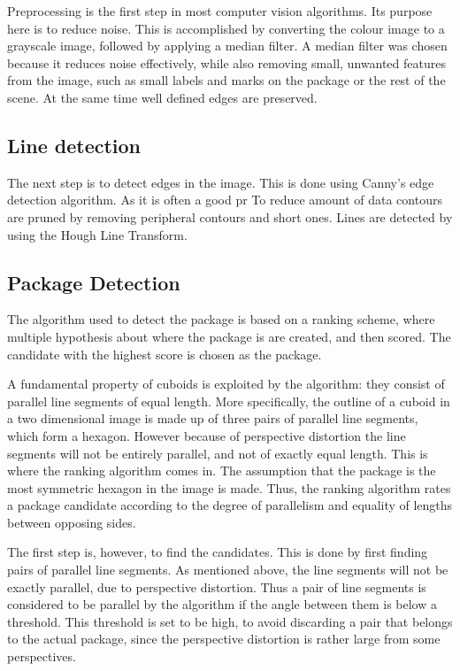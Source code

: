 Preprocessing is the first step in most computer vision algorithms. 
Its purpose here is to reduce noise. 
This is accomplished by converting the colour image to a grayscale image, followed by applying a median filter. 
A median filter was chosen because it reduces noise effectively, while also removing small, unwanted features from the image, such as small labels and marks on the package or the rest of the scene. 
At the same time well defined edges are preserved.

\subsection{Line detection} %
The next step is to detect edges in the image. This is done using Canny's edge detection algorithm. As it is often a good pr
To reduce amount of data contours are pruned by removing peripheral contours and short ones.
Lines are detected by using the Hough Line Transform.

\subsection{Package Detection}

The algorithm used to detect the package is based on a ranking scheme, where multiple hypothesis about where the package is are created, and then scored. 
The candidate with the highest score is chosen as the package. 

A fundamental property of cuboids is exploited by the algorithm: they consist of parallel line segments of equal length. 
More specifically, the outline of a cuboid in a two dimensional image is made up of three pairs of parallel line segments, which form a hexagon. 
However because of perspective distortion the line segments will not be entirely parallel, and not  of exactly equal length.
This is where the ranking algorithm comes in.
The assumption that the package is the most symmetric hexagon in the image is made. %
Thus, the ranking algorithm rates a package candidate according to the degree of parallelism and equality of lengths between opposing sides.

The first step is, however, to find the candidates.
This is done by first finding pairs of parallel line segments. 
As mentioned above, the line segments will not be exactly parallel, due to perspective distortion. %
Thus a pair of line segments is considered to be parallel by the algorithm if the angle between them is below a threshold. 
This threshold is set to be high, to avoid discarding a pair that belongs to the actual package, since the perspective distortion is rather large from some perspectives. %


